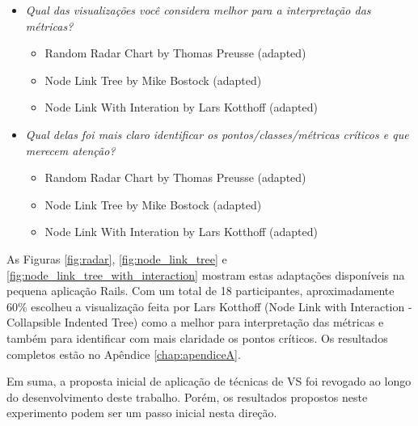 \begin{itemize}
  \item[] \textit{Qual das visualizações você considera melhor para a
	interpretação das métricas?}
		\begin{itemize}
			\item {Random Radar Chart by Thomas Preusse (adapted)}
			\item {Node Link Tree by Mike Bostock (adapted)}
			\item {Node Link With Interation by Lars Kotthoff (adapted)}
		\end{itemize}
  \item[] \textit{Qual delas foi mais claro identificar os
	pontos/classes/métricas críticos e que merecem atenção?}
		\begin{itemize}
			\item {Random Radar Chart by Thomas Preusse (adapted)}
			\item {Node Link Tree by Mike Bostock (adapted)}
			\item {Node Link With Interation by Lars Kotthoff (adapted)}
		\end{itemize}
\end{itemize}

As Figuras \ref{fig:radar}, \ref{fig:node_link_tree} e
\ref{fig:node_link_tree_with_interaction} mostram estas adaptações disponíveis
na pequena aplicação Rails.
%
Com um total de 18 participantes, aproximadamente 60\% escolheu a visualização
feita por Lars Kotthoff (Node Link with Interaction - Collapsible Indented
Tree) como a melhor para interpretação das métricas e também para identificar
com mais claridade os pontos críticos. Os resultados completos estão no Apêndice
\ref{chap:apendiceA}.

Em suma, a proposta inicial de aplicação de técnicas de VS foi revogado ao
longo do desenvolvimento deste trabalho. Porém, os resultados propostos neste
experimento podem ser um passo inicial nesta direção.
